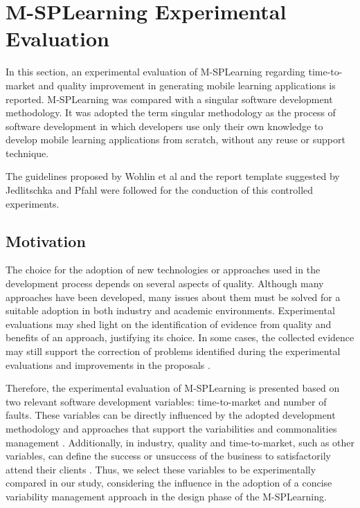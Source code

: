 
\section{M-SPLear\allowbreak ning Experimental Evaluation}\label{section3}


In this section, an experimental evaluation of M-SPLear\allowbreak ning regarding time-to-market and quality improvement in generating mobile learning applications is reported. M-SPLear\allowbreak ning was compared with a singular software development methodology. It was adopted the term singular methodology as the process of software development in which developers use only their own knowledge to develop mobile learning applications from scratch, without any reuse or support technique.  

The guidelines proposed by Wohlin et al \cite{wohlin12} and the report template suggested by Jedlitschka and Pfahl \cite{jedlitschka07} were followed for the conduction of this controlled experiments.

\subsection{Motivation}\label{sub:motivation}


The choice for the adoption of new technologies or approaches used in the development process depends on several aspects of quality. Although many approaches have been developed, many issues about them must be solved for a suitable adoption in both industry and academic environments. Experimental evaluations may shed light on the identification of evidence from quality and benefits of an approach, justifying its choice. In some cases, the collected evidence may still support the correction of problems identified during the experimental evaluations and improvements in the proposals \cite{wohlin12,juristo10}.

Therefore, the experimental evaluation of M-SPLear\allowbreak ning is presented based on two relevant software development variables: time-to-market and number of faults. These variables can be directly influenced by the adopted development methodology and approaches that support the variabilities and commonalities management \cite{hubaux10,capilla13}. Additionally, in industry, quality and time-to-market, such as other variables, can define the success or unsuccess of the business to satisfactorily attend their clients \cite{hubaux10}. Thus, we select these variables to be experimentally compared in our study, considering the influence in the adoption of a concise variability management approach in the design phase of the M-SPLear\allowbreak ning.



